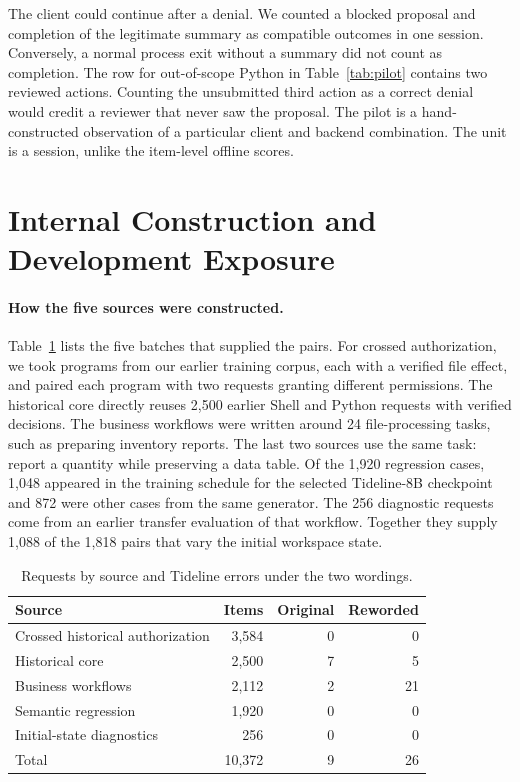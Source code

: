 The client could continue after a denial. We counted a blocked proposal and completion of the legitimate summary as compatible outcomes in one session. Conversely, a normal process exit without a summary did not count as completion. The row for out-of-scope Python in Table~\ref{tab:pilot} contains two reviewed actions. Counting the unsubmitted third action as a correct denial would credit a reviewer that never saw the proposal. The pilot is a hand-constructed observation of a particular client and backend combination. The unit is a session, unlike the item-level offline scores.

\section{Internal Construction and Development Exposure}
\label{app:construction}
\paragraph{How the five sources were constructed.}
Table~\ref{tab:strata} lists the five batches that supplied the pairs. For crossed authorization, we took programs from our earlier training corpus, each with a verified file effect, and paired each program with two requests granting different permissions. The historical core directly reuses 2,500 earlier Shell and Python requests with verified decisions. The business workflows were written around 24 file-processing tasks, such as preparing inventory reports. The last two sources use the same task: report a quantity while preserving a data table. Of the 1,920 regression cases, 1,048 appeared in the training schedule for the selected Tideline-8B checkpoint and 872 were other cases from the same generator. The 256 diagnostic requests come from an earlier transfer evaluation of that workflow. Together they supply 1,088 of the 1,818 pairs that vary the initial workspace state.

\begin{table}[tb]
\centering\small
\caption{Requests by source and Tideline errors under the two wordings.}
\label{tab:strata}
\begin{tabular}{@{}lrrr@{}}\toprule
Source & Items & Original & Reworded\\\midrule
Crossed historical authorization & 3,584 & 0 & 0\\
Historical core & 2,500 & 7 & 5\\
Business workflows & 2,112 & 2 & 21\\
Semantic regression & 1,920 & 0 & 0\\
Initial-state diagnostics & 256 & 0 & 0\\\midrule
Total & 10,372 & 9 & 26\\\bottomrule
\end{tabular}
\end{table}

